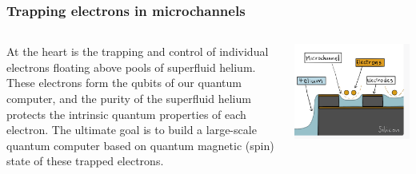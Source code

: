 \documentclass{beamer}
\begin{document}
\frame
    {
      \frametitle{Trapping electrons in microchannels}
	
      \begin{footnotesize}
     \begin{columns}
       \column{5.0cm}

       At the heart is the trapping and control
       of individual electrons floating above pools of superfluid
       helium. These electrons form the qubits of our quantum
       computer, and the purity of the superfluid helium protects the
       intrinsic quantum properties of each electron. The  ultimate
       goal is to build a large-scale quantum computer based on
       quantum magnetic (spin) state of these trapped electrons.


\column{5cm}
      \begin{center}
	\includegraphics[width=1.2\textwidth]{qcfigures/nordicquantumfig2.png}
      \end{center}
\end{columns}
      \end{footnotesize}
    }
\end{document}
